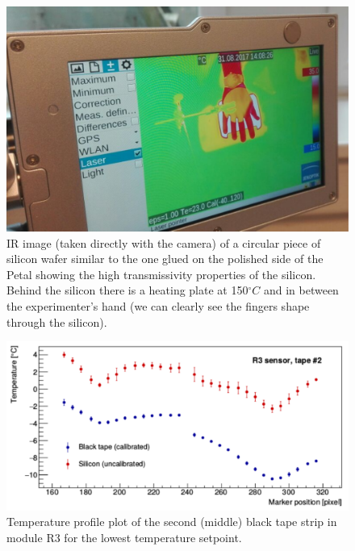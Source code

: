 		\begin{figure}[ht!]
			\centering
			\captionsetup{justification=centering,margin=2cm}
			\includegraphics[scale=0.35]{Figures/Chapter04/HandTransmission.pdf}
			\caption{IR image (taken directly with the camera) of a circular piece of silicon wafer similar to the one glued on the polished side of the Petal showing the high transmissivity properties of the silicon. Behind the silicon there is a heating plate at 150\space$^\circ C$ and in between the experimenter's hand (we can clearly see the fingers shape through the silicon).}\label{fig4.4}
		\end{figure}
		
		\begin{figure}[ht!]
			\centering
			\captionsetup{justification=centering,margin=2cm}
			\includegraphics[scale=0.35]{Figures/Chapter04/R3Profile_Si_and_BT.pdf}
			\caption{Temperature profile plot of the second (middle) black tape strip in module R3 for the lowest temperature setpoint.}\label{fig4.5}
		\end{figure}
		
